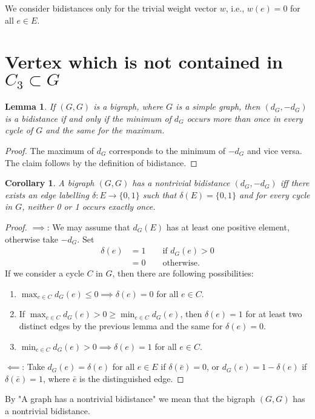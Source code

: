 \documentclass[a4paper, 11pt]{article}
\newtheorem{lem}[thm]{Lemma}
\newtheorem{cor}[thm]{Corollary}
\theoremstyle{definition}
\begin{document}
We consider bidistances only for the trivial weight vector $w$, i.e., $w(e)=0$ for all $e\in E$.

\section{Vertex which is not contained in $C_3\subset G$}
\begin{lem}
If $(G,G)$ is a bigraph, where $G$ is a simple graph, then $(d_G, -d_G)$ is a bidistance if and only if the minimum of $d_G$ occurs more than once in every cycle of $G$ and the same for the maximum.
\end{lem}
\begin{proof}
The maximum of $d_G$ corresponds to the minimum of $-d_G$ and vice versa. The claim follows by the definition of bidistance.
\end{proof}

\begin{cor}
\label{cor:binaryLabelling}
A bigraph $(G,G)$ has a nontrivial bidistance $(d_G, -d_G)$ iff there exists an edge labelling $\delta:E\rightarrow \{0,1\}$ such that $\delta(E)=\{0,1\}$ and for every cycle in $G$, neither 0 or 1 occurs exactly once.
\end{cor}
\begin{proof}
$\implies$: We may assume that $d_G(E)$ has at least one positive element, otherwise take $-d_G$. Set
\begin{align*}
\delta(e)&=1 \qquad \text{if } d_G(e)>0 \\
		&=0 \qquad \text{otherwise.}
\end{align*}
If we consider a cycle $C$ in $G$, then there are following possibilities:
\begin{enumerate}
	\item $\max_{e\in C} d_G(e) \leq 0 \implies \delta(e)=0$ for all $e \in C$.
	\item If $\max_{e\in C} d_G(e) > 0 \geq \min_{e\in C} d_G(e)$, then $\delta(e)=1$ for at least two distinct edges by the previous lemma and the same for $\delta(e)=0$.
	\item $\min_{e\in C} d_G(e) > 0 \implies \delta(e)=1$ for all $e \in C$.
\end{enumerate}
$\impliedby$: Take $d_G(e)=\delta(e)$ for all $e\in E$ if $\delta(\bar{e})=0$, or $d_G(e)=1-\delta(e)$ if $\delta(\bar{e})=1$, where $\bar{e}$ is the distinguished edge.
\end{proof}

By "A graph has a nontrivial bidistance" we mean that the bigraph $(G,G)$ has a nontrivial bidistance.
\end{document}
